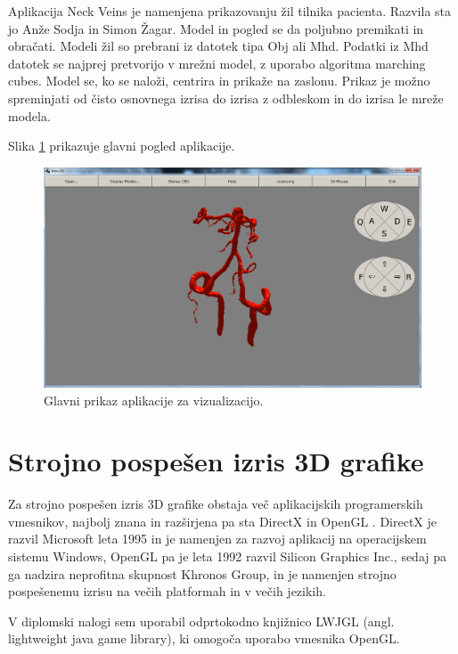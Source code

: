 \documentclass[a4paper, 12pt]{book}
\begin{document}
Aplikacija Neck Veins je namenjena prikazovanju žil tilnika pacienta. Razvila sta jo Anže Sodja\cite{sodja} in Simon Žagar\cite{zagar}. Model in pogled se da poljubno premikati in obračati. Modeli žil so prebrani iz datotek tipa Obj ali Mhd. Podatki iz Mhd datotek se najprej pretvorijo v mrežni model, z uporabo algoritma marching cubes.  Model se, ko se naloži, centrira in prikaže na zaslonu. Prikaz je možno spreminjati od čisto osnovnega izrisa do izrisa z odbleskom in do izrisa le mreže modela.

Slika \ref{aplikacija} prikazuje glavni pogled aplikacije. 

\begin{figure}[h!]
\begin{center}
\includegraphics[width=14cm]{Aplikacija.png}
\end{center}
\caption{Glavni prikaz aplikacije za vizualizacijo.}
\label{aplikacija}
\end{figure}

\section{Strojno pospešen izris 3D grafike}
Za strojno pospešen izris 3D grafike obstaja več aplikacijskih programerskih vmesnikov, najbolj znana in razširjena pa sta DirectX \cite{DirectX} in OpenGL \cite{OpenGL}. DirectX je razvil Microsoft leta 1995 in je namenjen za razvoj aplikacij na operacijskem sistemu Windows, OpenGL pa je leta 1992 razvil Silicon Graphics Inc., sedaj pa ga nadzira neprofitna skupnost Khronos Group, in je namenjen strojno pospešenemu izrisu na večih platformah in v večih jezikih. 

V diplomski nalogi sem uporabil odprtokodno knjižnico LWJGL (angl. lightweight java game library), ki omogoča uporabo vmesnika OpenGL.
\end{document}
